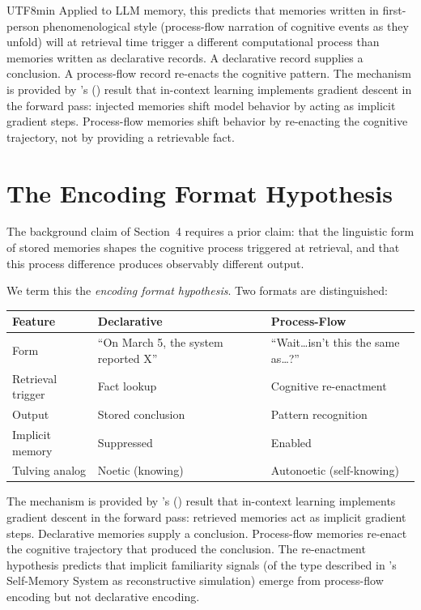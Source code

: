 \documentclass[12pt,a4paper]{article}
\begin{document}
\begin{CJK}{UTF8}{min}
Applied to LLM memory, this predicts that memories written in first-person
phenomenological style (process-flow narration of cognitive events as they
unfold) will at retrieval time trigger a different computational process than
memories written as declarative records. A declarative record supplies a
conclusion. A process-flow record re-enacts the cognitive pattern. The
mechanism is provided by \citeauthor{vonoswald2023}'s (\citeyear{vonoswald2023})
result that in-context learning implements gradient descent in the forward pass:
injected memories shift model behavior by acting as implicit gradient steps.
Process-flow memories shift behavior by re-enacting the cognitive trajectory,
not by providing a retrievable fact.

\section{The Encoding Format Hypothesis}

The background claim of Section~4 requires a prior claim: that the linguistic
form of stored memories shapes the cognitive process triggered at retrieval,
and that this process difference produces observably different output.

We term this the \emph{encoding format hypothesis}. Two formats are
distinguished:

\begin{center}
\begin{tabular}{lp{5cm}p{5cm}}
\toprule
\textbf{Feature} & \textbf{Declarative} & \textbf{Process-Flow} \\
\midrule
Form & ``On March 5, the system reported X'' & ``Wait\ldots isn't this the same as\ldots?'' \\
Retrieval trigger & Fact lookup & Cognitive re-enactment \\
Output & Stored conclusion & Pattern recognition \\
Implicit memory & Suppressed & Enabled \\
Tulving analog & Noetic (knowing) & Autonoetic (self-knowing) \\
\bottomrule
\end{tabular}
\end{center}

The mechanism is provided by \citeauthor{vonoswald2023}'s
(\citeyear{vonoswald2023}) result that in-context learning implements gradient
descent in the forward pass: retrieved memories act as implicit gradient steps.
Declarative memories supply a conclusion. Process-flow memories re-enact the
cognitive trajectory that produced the conclusion. The re-enactment hypothesis
predicts that implicit familiarity signals (of the type described in
\citet{conway2000}'s Self-Memory System as reconstructive simulation) emerge
from process-flow encoding but not declarative encoding.


\end{CJK}
\end{document}

